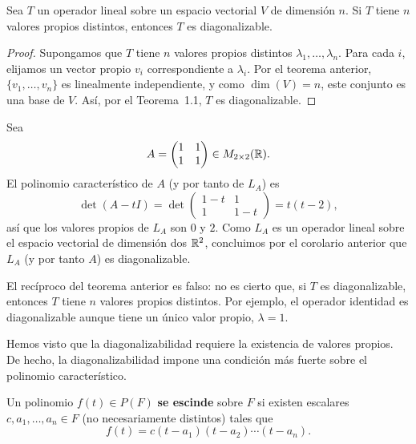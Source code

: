 \documentclass[12pt,a4paper]{book}
\begin{document}
    \begin{corolario}
        Sea $T$ un operador lineal sobre un espacio vectorial $V$ de dimensión $n$. Si $T$ tiene $n$ valores propios distintos, entonces $T$ es diagonalizable.
    \end{corolario}

    \begin{proof}
        Supongamos que $T$ tiene $n$ valores propios distintos $\lambda_1,\dots,\lambda_n$. Para cada $i$, elijamos un vector propio $v_i$ correspondiente a $\lambda_i$. Por el teorema anterior, $\{v_1,\dots,v_n\}$ es linealmente independiente, y como $\dim(V)=n$, este conjunto es una base de $V$. Así, por el Teorema~1.1, $T$ es diagonalizable.
    \end{proof}

    \begin{ejemplo}
        Sea
        \begin{equation*}
            A=\begin{pmatrix}1&1\\1&1\end{pmatrix}\in M_{2\times2}(\mathbb{R}).
        \end{equation*}
        El polinomio característico de $A$ (y por tanto de $L_A$) es
        \begin{equation*}
            \det(A-tI)=\det\begin{pmatrix}1-t&1\\1&1-t\end{pmatrix}=t(t-2),
        \end{equation*}
        así que los valores propios de $L_A$ son $0$ y $2$. Como $L_A$ es un operador lineal sobre el espacio vectorial de dimensión dos $\mathbb{R}^2$, concluimos por el corolario anterior que $L_A$ (y por tanto $A$) es diagonalizable.
    \end{ejemplo}

    El recíproco del teorema anterior es falso: no es cierto que, si $T$ es diagonalizable, entonces $T$ tiene $n$ valores propios distintos. Por ejemplo, el operador identidad es diagonalizable aunque tiene un único valor propio, $\lambda=1$.

    Hemos visto que la diagonalizabilidad requiere la existencia de valores propios. De hecho, la diagonalizabilidad impone una condición más fuerte sobre el polinomio característico.

    \begin{definicion}
        Un polinomio $f(t) \in P(F)$ \textbf{se escinde} sobre $F$ si existen escalares $c,a_1,\dots,a_n \in F$ (no necesariamente distintos) tales que
        \begin{equation*}
            f(t)=c(t-a_1)(t-a_2)\cdots(t-a_n).
        \end{equation*}
    \end{definicion}
\end{document}
